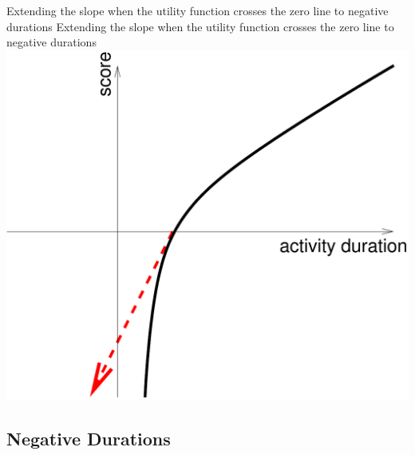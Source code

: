 \createfigure%
{Extending the slope when the utility function crosses the zero line to negative durations}%
{Extending the slope when the utility function crosses the zero line to negative durations}%
{\label{tab:score-extension}}%
{\includegraphics[width=0.4\hsize,trim=0 0 0 0,clip]{using/figures/score-extension}}%
{}

\subsection{Negative Durations}
\label{sec:negative-durations}

